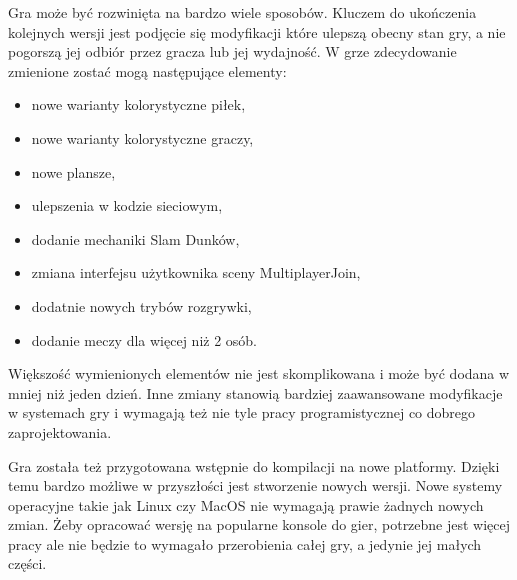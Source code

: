 \documentclass[a4paper,12pt,twoside,openany]{report}
\begin{document}
Gra może być rozwinięta na bardzo wiele sposobów. Kluczem do ukończenia kolejnych wersji jest podjęcie się modyfikacji które ulepszą obecny stan gry, a nie pogorszą jej odbiór przez gracza lub jej wydajność. W grze zdecydowanie zmienione zostać mogą następujące elementy:
\begin{itemize}
    \item nowe warianty kolorystyczne piłek,
    \item nowe warianty kolorystyczne graczy,
    \item nowe plansze,
    \item ulepszenia w kodzie sieciowym,
    \item dodanie mechaniki Slam Dunków,
    \item zmiana interfejsu użytkownika sceny MultiplayerJoin,
    \item dodatnie nowych trybów rozgrywki,
    \item dodanie meczy dla więcej niż 2 osób.
\end{itemize}
Większość wymienionych elementów nie jest skomplikowana i może być dodana w mniej niż jeden dzień. Inne zmiany stanowią bardziej zaawansowane modyfikacje w systemach gry i wymagają też nie tyle pracy programistycznej co dobrego zaprojektowania.

Gra została też przygotowana wstępnie do kompilacji na nowe platformy. Dzięki temu bardzo możliwe w przyszłości jest stworzenie nowych wersji. Nowe systemy operacyjne takie jak Linux czy MacOS nie wymagają prawie żadnych nowych zmian. Żeby opracować wersję na popularne konsole do gier, potrzebne jest więcej pracy ale nie będzie to wymagało przerobienia całej gry, a jedynie jej małych części.

\end{document}
